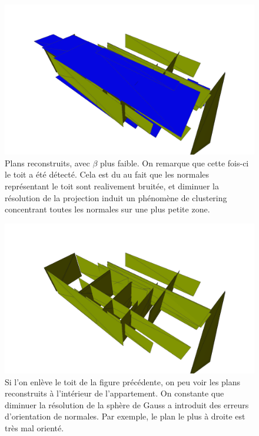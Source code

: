 \documentclass{article}
\begin{document}
\begin{figure}[H]
\centering
\includegraphics[width=\columnwidth]{../appart06.png}
\caption{Plans reconstruits, avec $\beta$ plus faible. On remarque que cette fois-ci le toit a été détecté. Cela est du au fait que les normales représentant le toit sont realivement bruitée, et diminuer la résolution de la projection induit un phénomène de clustering concentrant toutes les normales sur une plus petite zone.}
\end{figure}


\begin{figure}[H]
\centering
\includegraphics[width=\columnwidth]{../appart05.png}
\caption{Si l'on enlève le toit de la figure précédente, on peu voir les plans reconstruits à l'intérieur de l'appartement. On constante que diminuer la résolution de la sphère de Gauss a introduit des erreurs d'orientation de normales. Par exemple, le plan le plus à droite est très mal orienté.}
\end{figure}
\end{document}
